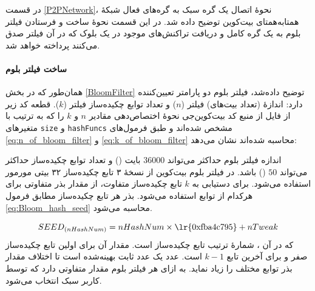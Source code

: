 در قسمت \ref{P2PNetwork}، نحوهٔ اتصال یک گره سبک به گره‌های فعال شبکه‌ٔ همتا‌به‌همتای بیت‌کوین توضیح داده شد. در این قسمت نحوهٔ ساخت و فرستادن فیلتر بلوم به یک گره کامل و دریافت تراکنش‌های موجود در یک بلوک که در آن فیلتر صدق می‌کنند پرداخته خواهد شد.

\paragraph{ساخت فیلتر بلوم}
همان‌طور که در بخش \ref{BloomFilter} توضیح داده‌شد، فیلتر بلوم دو پارامتر تعیین‌کننده دارد: اندازهٔ (تعداد بیت‌های) فیلتر ($n$) و تعداد توابع چکیده‌ساز فیلتر ($k$). قطعه کد زیر از فایل  از منبع کد بیت‌کوین‌جی \cite{bitcoinj_BloomFilter} نحوه‌ٔ اختصاص‌دهی مقادیر $n$ و $k$ را که به ترتیب با متغیر‌های \texttt{size} و \texttt{hashFuncs} مشخص شده‌اند و طبق فرمول‌های \eqref{eq:n_of_bloom_filter} و \eqref{eq:k_of_bloom_filter} محاسبه شده‌اند نشان می‌دهد:


اندازه فیلتر بلوم حداکثر می‌تواند $36000$ بایت () و تعداد توابع چکیده‌ساز حداکثر می‌تواند $50$ () باشد. در فیلتر بلوم بیت‌کوین از نسخهٔ ۳ تابع چکیده‌ساز ۳۲ بیتی 
مورمور 
استفاده می‌شود\cite{Hearn2013}. برای دستیابی به $k$ تابع چکیده‌ساز متفاوت، از مقدار 
بذر 
متفاوتی برای هرکدام از توابع استفاده می‌شود. بذر هر تابع چکیده‌ساز مطابق فرمول \eqref{eq:Bloom_hash_seed} محاسبه می‌شود.

\begin{equation}
\label{eq:Bloom_hash_seed}
SEED_{(nHashNum)} = nHashNum \times \text{\lr{0xfba4c795}} + nTweak
\end{equation}
که در آن ، شمارهٔ ترتیب تابع چکیده‌ساز است. مقدار آن برای اولین تابع چکیده‌ساز صفر و برای آخرین تابع $k-1$ است. عدد  یک عدد ثابت بهینه‌شده است تا اختلاف مقدار بذر توابع مختلف را زیاد نماید.  به ازای هر فیلتر بلوم مقدار متفاوتی دارد که توسط کاربر سبک انتخاب می‌شود. 

